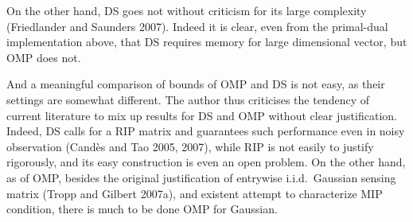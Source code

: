 \startsection [title={Discussion}]

On the other hand, DS goes not without criticism for its large complexity (Friedlander and Saunders 2007).
Indeed it is clear, even from the primal-dual implementation above, that DS requires memory for large dimensional vector, but OMP does not.

And a meaningful comparison of bounds of OMP and DS is not easy, as their settings are somewhat different.
The author thus criticises the tendency of current literature to mix up results for DS and OMP without clear justification.
Indeed, DS calls for a RIP matrix and guarantees such performance even in noisy observation (Cand\`es and Tao 2005, 2007), while RIP is not easily to justify rigorously, and its easy construction is even an open problem.
On the other hand, as of OMP, besides the original justification of entrywise i.i.d.\ Gaussian sensing matrix (Tropp and Gilbert 2007a), and existent attempt to characterize MIP condition, there is much to be done OMP for Gaussian.

\stopsection

\stopchapter
